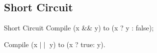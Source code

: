 \subsection{Short Circuit}

\begin{frame}{Short Circuit}
    Compile (x \&\& y) to (x ? y : false);

    Compile (x $\mid\mid$ y) to (x ? true: y).
\end{frame}
